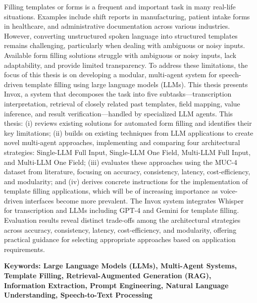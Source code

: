 Filling templates or forms is a frequent and important task in many real-life situations. Examples include shift reports in manufacturing, patient intake forms in healthcare, and administrative documentation across various industries. However, converting unstructured spoken language into structured templates remains challenging, particularly when dealing with ambiguous or noisy inputs. Available form filling solutions struggle with ambiguous or noisy inputs, lack adaptability, and provide limited transparency.
To address these limitations, the focus of this thesis is on developing a modular, multi-agent system for speech-driven template filling using large language models (LLMs). This thesis presents Invox, a system that decomposes the task into five subtasks—transcription interpretation, retrieval of closely related past templates, field mapping, value inference, and result verification—handled by specialized LLM agents.
This thesis: (i) reviews existing solutions for automated form filling and identifies their key limitations; (ii) builds on existing techniques from LLM applications to create novel multi-agent approaches, implementing and comparing four architectural strategies: Single-LLM Full Input, Single-LLM One Field, Multi-LLM Full Input, and Multi-LLM One Field; (iii) evaluates these approaches using the MUC-4 dataset from literature, focusing on accuracy, consistency, latency, cost-efficiency, and modularity; and (iv) derives concrete instructions for the implementation of template filling applications, which will be of increasing importance as voice-driven interfaces become more prevalent.
The Invox system integrates Whisper for transcription and LLMs including GPT-4 and Gemini for template filling. Evaluation results reveal distinct trade-offs among the architectural strategies across accuracy, consistency, latency, cost-efficiency, and modularity, offering practical guidance for selecting appropriate approaches based on application requirements.

\textbf{Keywords: Large Language Models (LLMs), Multi-Agent Systems, Template Filling, Retrieval-Augmented Generation (RAG), Information Extraction, Prompt Engineering, Natural Language Understanding, Speech-to-Text Processing}